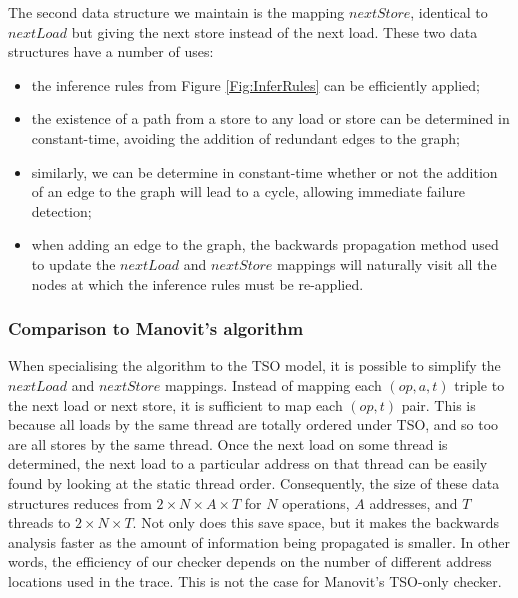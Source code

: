 \documentclass[11pt]{article}
\begin{document}
The second data structure we maintain is the mapping $nextStore$,
identical to $nextLoad$ but giving the next store instead of the next
load.  These two data structures have a number of uses:

\begin{itemize}

\item the inference rules from Figure \ref{Fig:InferRules} can be
efficiently applied;

\item the existence of a path from a store to any load or store can
be determined in constant-time, avoiding the addition of
redundant edges to the graph;

\item similarly, we can be determine in constant-time whether or not
the addition of an edge to the graph will lead to a cycle, allowing
immediate failure detection;

\item when adding an edge to the graph, the backwards propagation
method used to update the $nextLoad$ and $nextStore$ mappings will
naturally visit all the nodes at which the inference rules must be
re-applied.

\end{itemize}

\subsubsection*{Comparison to Manovit's algorithm}

When specialising the algorithm to the TSO model, it is possible to
simplify the $nextLoad$ and $nextStore$ mappings.  Instead of mapping
each $(op, a, t)$ triple to the next load or next store, it is
sufficient to map each $(op, t)$ pair.  This is because all loads by
the same thread are totally ordered under TSO, and so too are all
stores by the same thread.  Once the next load on some
thread is determined, the next load to a particular address on that
thread can be easily found by looking at the static thread order.
Consequently, the size of these data structures reduces from $2 \times
N \times A \times T$ for $N$ operations, $A$ addresses, and $T$
threads to $2 \times N \times T$.  Not only does this save space, but
it makes the backwards analysis faster as the amount of information
being propagated is smaller.  In other words, the efficiency of our
checker depends on the number of different address locations used in
the trace.  This is not the case for Manovit's TSO-only checker.
\end{document}
